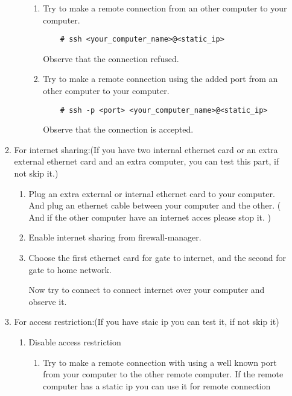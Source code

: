 \documentclass[a4paper,10pt]{article}
\begin{document}
\begin{enumerate}
\begin{enumerate}
\begin{enumerate}
        \begin{enumerate}
            \item Try to make a remote connection from an other computer to your computer.
\begin{verbatim}
    # ssh <your_computer_name>@<static_ip>
\end{verbatim}                 Observe that the connection refused.

            \item Try to make a remote connection using the added port from an other computer to your computer.
\begin{verbatim}
    # ssh -p <port> <your_computer_name>@<static_ip>
\end{verbatim}
                 Observe that the connection is accepted.
        \end{enumerate}
    \end{enumerate}
    \item For internet sharing:(If you have two internal ethernet card or an extra external ethernet card and an extra computer, you can test this part, if not skip it.)
        \begin{enumerate}
        \item Plug an extra external or internal ethernet card to your computer. And plug an ethernet cable between your computer and the other. ( And if the other computer have an internet acces please stop it. )

        \item Enable internet sharing from firewall-manager.

        \item Choose the first ethernet card for gate to internet, and the second for gate to home network.

              Now try to connect to connect internet over your computer and observe it.
        \end{enumerate}
    \item For access restriction:(If you have staic ip you can test it, if not skip it)
        \begin{enumerate}
        \item Disable access restriction
            \begin{enumerate}
            \item Try to make a remote connection with using a well known port from your computer to the other remote computer.
                If the remote computer has a static ip you can use it for remote connection


\end{enumerate}
\end{enumerate}
\end{enumerate}
\end{enumerate}
\end{document}
